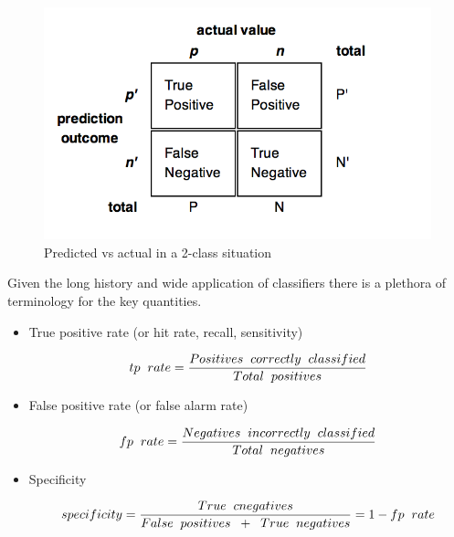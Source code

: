 \begin{figure}
  \includegraphics[width=.8\textwidth,height=0.3\textheight]{../images/confMatrix}
  \caption{Predicted vs actual in a 2-class situation}
  \label{class:confMat}
\end{figure}

\newpage

Given the long history and wide application of classifiers there is a plethora of terminology for the key quantities. 

\begin{itemize}
        \item True positive rate (or hit rate, recall, sensitivity)

            
            $$tp\hspace{2mm}rate = \dfrac{Positives\hspace{2mm}correctly\hspace{2mm}classified}{Total\hspace{2mm}positives}$$ 

        \item False positive rate (or false alarm rate)

            
            $$fp\hspace{2mm}rate = \dfrac{Negatives\hspace{2mm}incorrectly\hspace{2mm}classified}{Total\hspace{2mm}negatives}$$ 


         \item Specificity
            
             $$specificity = \dfrac{True\hspace{2mm}cnegatives}{False\hspace{2mm}positives\hspace{2mm}+\hspace{2mm}True\hspace{2mm}negatives} = 1 - fp\hspace{2mm}rate$$

\end{itemize}


